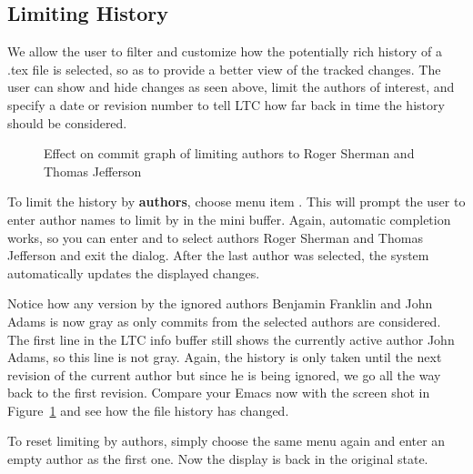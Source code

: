 \subsection{Limiting History} \label{sec:emacs-limit-history}

We allow the user to filter and customize how the potentially rich history of a .tex file is selected, so as to provide a better view of the tracked changes.  The user can show and hide changes as seen above, limit the authors of interest, and specify a date or revision number to tell LTC how far back in time the history should be considered.


\begin{figure}
\centering
{}
\caption[Effect on commit graph of limiting authors]{Effect on commit graph of limiting authors to Roger Sherman and Thomas Jefferson} \label{fig:emacs-limit-authors}
\end{figure}
To limit the history by \textbf{authors}, choose menu item . This will prompt the user to enter author names to limit by in the mini buffer.  Again, automatic completion works, so you can enter  and  to select authors Roger Sherman and Thomas Jefferson and exit the dialog.  After the last author was selected, the system automatically updates the displayed changes.

Notice how any version by the ignored authors Benjamin Franklin and John Adams is now gray as only commits from the selected authors are considered.  The first line in the LTC info buffer still shows the currently active author John Adams, so this line is not gray.  Again, the history is only taken until the next revision of the current author but since he is being ignored, we go all the way back to the first revision. Compare your Emacs now with the screen shot in Figure~\ref{fig:emacs-limit-authors} and see how the file history has changed.

To reset limiting by authors, simply choose the same menu  again and enter an empty author as the first one.  Now the display is back in the original state.


